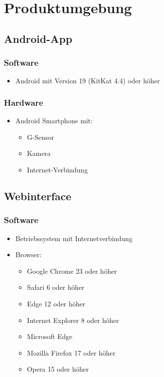 \chapter{Produktumgebung}
\section{Android-App}
\subsection{Software}
\begin{itemize} 
\item Android mit Version 19 (KitKat 4.4) oder h\"oher
\end{itemize}
\subsection{Hardware}
\begin{itemize} 
	\item Android Smartphone mit:
	\begin{itemize}
		\item G-Sensor 
		\item Kamera
		\item Internet-Verbindung
	\end{itemize}
\end{itemize}

\section{Webinterface}
\subsection{Software}
\begin{itemize} 
\item Betriebssystem mit Internetverbindung
\item Browser:
	\begin{itemize}
		\item Google Chrome 23 oder h\"oher
		\item Safari 6 oder h\"oher
		\item Edge 12 oder h\"oher
		\item Internet Explorer 8 oder h\"oher
		\item Microsoft Edge
		\item Mozilla Firefox 17 oder h\"oher
		\item Opera 15 oder h\"oher
	\end{itemize}
\end{itemize}
